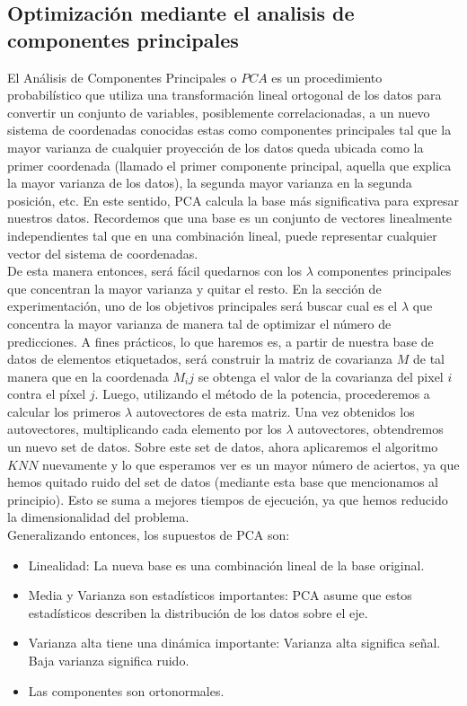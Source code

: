 \subsection {Optimización mediante el analisis de componentes principales}
El Análisis de Componentes Principales o $PCA$ es un procedimiento probabilístico que utiliza una transformación lineal ortogonal de los datos para convertir un conjunto de variables, posiblemente correlacionadas, a un nuevo sistema de coordenadas conocidas estas como componentes principales tal que la mayor varianza de cualquier proyección de los datos queda ubicada como la primer coordenada (llamado el primer componente principal, aquella que explica la mayor varianza de los datos), la segunda mayor varianza en la segunda posición, etc. En este sentido, PCA calcula la base más significativa para expresar nuestros datos. Recordemos que una base es un conjunto de vectores linealmente independientes tal que en una combinación lineal, puede representar cualquier vector del sistema de coordenadas.
\\
De esta manera entonces, será fácil quedarnos con los $\lambda$ componentes principales que concentran la mayor varianza y quitar el resto. En la sección de experimentación, uno de los objetivos principales será buscar cual es el $\lambda$ que concentra la mayor varianza de manera tal de optimizar el número de predicciones. 
A fines prácticos, lo que haremos es, a partir de nuestra base de datos de elementos etiquetados, será construir la matriz de covarianza $M$ de tal manera que en la coordenada $M_ij$ se obtenga el valor de la covarianza del pixel $i$ contra el píxel $j$.
Luego, utilizando el método de la potencia, procederemos a calcular los primeros $\lambda$ autovectores de esta matriz. Una vez obtenidos los autovectores, multiplicando cada elemento por los $\lambda$ autovectores, obtendremos un nuevo set de datos.
Sobre este set de datos, ahora aplicaremos el algoritmo $KNN$ nuevamente y lo que esperamos ver es un mayor número de aciertos, ya que hemos quitado ruido del set de datos (mediante esta base que mencionamos al principio). Esto se suma a mejores tiempos de ejecución, ya que hemos reducido la dimensionalidad del problema.
\\
Generalizando entonces, los supuestos de PCA son:
\begin{itemize}
 \item Linealidad: La nueva base es una combinación lineal de la base original.
 \item Media y Varianza son estadísticos importantes: PCA asume que estos estadísticos describen la distribución de los datos sobre el eje.
 \item Varianza alta tiene una dinámica importante: Varianza alta significa se\~nal. Baja varianza significa ruido.
 \item Las componentes son ortonormales.
\end{itemize}

